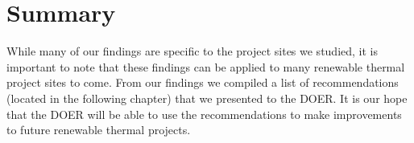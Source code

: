 \section{Summary}
\par While many of our findings are specific to the project sites we studied, it is important to note that these findings can be applied to many renewable thermal project sites to come. From our findings we compiled a list of recommendations (located in the following chapter) that we presented to the DOER. It is our hope that the DOER will be able to use the recommendations to make improvements to future renewable thermal projects.

